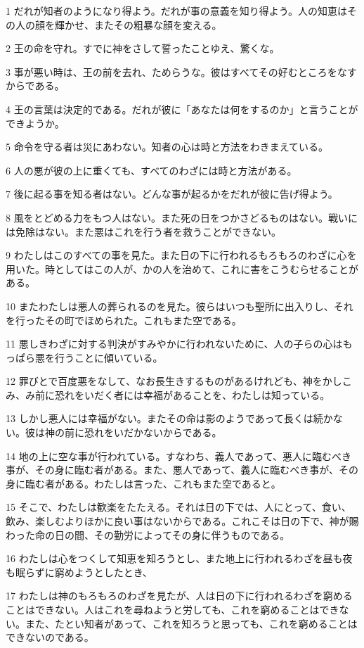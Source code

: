 \par 1 だれが知者のようになり得よう。だれが事の意義を知り得よう。人の知恵はその人の顔を輝かせ、またその粗暴な顔を変える。
\par 2 王の命を守れ。すでに神をさして誓ったことゆえ、驚くな。
\par 3 事が悪い時は、王の前を去れ、ためらうな。彼はすべてその好むところをなすからである。
\par 4 王の言葉は決定的である。だれが彼に「あなたは何をするのか」と言うことができようか。
\par 5 命令を守る者は災にあわない。知者の心は時と方法をわきまえている。
\par 6 人の悪が彼の上に重くても、すべてのわざには時と方法がある。
\par 7 後に起る事を知る者はない。どんな事が起るかをだれが彼に告げ得よう。
\par 8 風をとどめる力をもつ人はない。また死の日をつかさどるものはない。戦いには免除はない。また悪はこれを行う者を救うことができない。
\par 9 わたしはこのすべての事を見た。また日の下に行われるもろもろのわざに心を用いた。時としてはこの人が、かの人を治めて、これに害をこうむらせることがある。
\par 10 またわたしは悪人の葬られるのを見た。彼らはいつも聖所に出入りし、それを行ったその町でほめられた。これもまた空である。
\par 11 悪しきわざに対する判決がすみやかに行われないために、人の子らの心はもっぱら悪を行うことに傾いている。
\par 12 罪びとで百度悪をなして、なお長生きするものがあるけれども、神をかしこみ、み前に恐れをいだく者には幸福があることを、わたしは知っている。
\par 13 しかし悪人には幸福がない。またその命は影のようであって長くは続かない。彼は神の前に恐れをいだかないからである。
\par 14 地の上に空な事が行われている。すなわち、義人であって、悪人に臨むべき事が、その身に臨む者がある。また、悪人であって、義人に臨むべき事が、その身に臨む者がある。わたしは言った、これもまた空であると。
\par 15 そこで、わたしは歓楽をたたえる。それは日の下では、人にとって、食い、飲み、楽しむよりほかに良い事はないからである。これこそは日の下で、神が賜わった命の日の間、その勤労によってその身に伴うものである。
\par 16 わたしは心をつくして知恵を知ろうとし、また地上に行われるわざを昼も夜も眠らずに窮めようとしたとき、
\par 17 わたしは神のもろもろのわざを見たが、人は日の下に行われるわざを窮めることはできない。人はこれを尋ねようと労しても、これを窮めることはできない。また、たとい知者があって、これを知ろうと思っても、これを窮めることはできないのである。

